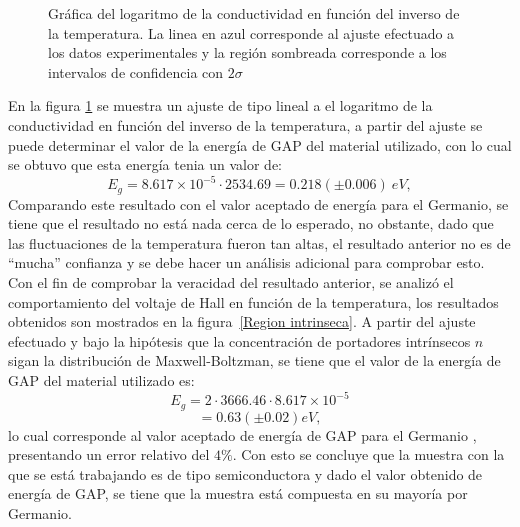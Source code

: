 \documentclass[%
 reprint,
 amsmath,amssymb,
 aps,
]{revtex4-1}
\begin{document}
\begin{figure}[h!]
\caption{\label{Conductividad en funcion de la temperatura}Gráfica del logaritmo de la conductividad en función del inverso de la temperatura.  La linea en azul corresponde al ajuste efectuado a los datos experimentales y la región sombreada corresponde a los intervalos de confidencia con $2\sigma$}
\end{figure}
En la figura \ref{Conductividad en funcion de la temperatura} se muestra un ajuste de tipo lineal a el logaritmo de la conductividad en función del inverso de la temperatura, a partir del ajuste se puede determinar el valor de la energía de GAP del material utilizado, con lo cual se obtuvo que esta energía tenia un valor de:
\[E_g=8.617\times 10^{-5}\cdot2534.69=0.218 (\pm 0.006) \ eV,\]
Comparando este resultado con el valor aceptado de energía para el Germanio\cite{Energia de gap}, se tiene que el resultado no está nada cerca de lo esperado, no obstante, dado que las fluctuaciones de la temperatura fueron tan altas, el resultado anterior no es de ``mucha'' confianza y se debe hacer un análisis adicional para comprobar esto. Con el fin de comprobar la veracidad del resultado anterior, se analizó el comportamiento del voltaje de Hall en función de la temperatura, los resultados obtenidos son mostrados en la figura~\ref{Region intrinseca}. A partir del ajuste efectuado y bajo la hipótesis que la concentración de portadores intrínsecos $n$  sigan la distribución de Maxwell-Boltzman, se tiene que el valor de la energía de GAP del material utilizado es:
\[E_g=2\cdot 3666.46 \cdot8.617\times 10^{-5}\]
\[=0.63 (\pm 0.02) eV,\]
lo cual corresponde al valor aceptado de energía de GAP para el Germanio \cite{Energia de gap}, presentando un error relativo del $4\%$. Con esto se concluye que la muestra con la que se está trabajando es de tipo semiconductora y dado el valor obtenido de energía de GAP, se tiene que la muestra está compuesta en su mayoría por Germanio.
\end{document}
